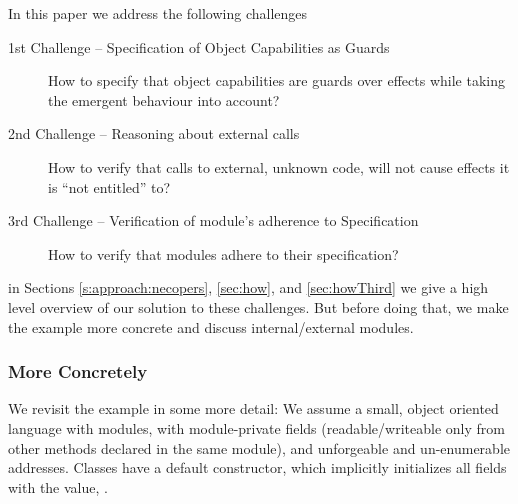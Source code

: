 \noindent
In this paper we address the following challenges
\begin{description}
\item[1st Challenge -- Specification of Object Capabilities as Guards] How to specify that object capabilities are guards over effects while taking the emergent behaviour into account?
\item[2nd Challenge -- Reasoning about external calls] How to verify that calls to external, unknown code, will not cause effects it is   ``not entitled'' to?
\item[3rd Challenge -- Verification of module's adherence to Specification] How to verify that modules adhere to their specification?
\end{description}


\noindent in Sections \ref{s:approach:necopers}, \ref{sec:how}, and \ref{sec:howThird} we give a high level overview of our solution to these challenges.
But before doing that, we make the example more concrete and discuss internal/external modules.

 \subsubsection{More Concretely}
We revisit the example in some more detail:
We assume a  small, object oriented language with modules, with module-private fields
(readable/writeable only from other methods declared in the same module),  
and unforgeable and un-enumerable addresses.
Classes have a default constructor, which implicitly initializes all fields   with the  value,
.
   



